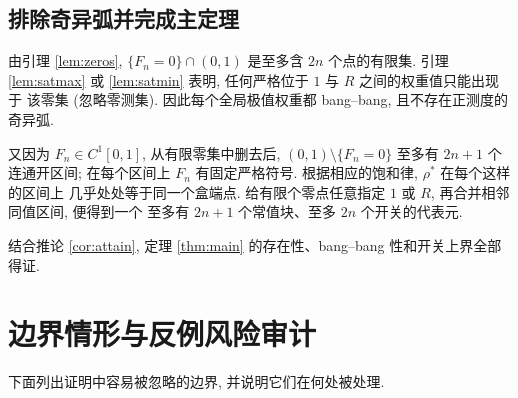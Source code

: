 \documentclass[UTF8]{ctexart}
\begin{document}
\subsection{排除奇异弧并完成主定理}

由引理 \ref{lem:zeros}, $\{F_n=0\}\cap(0,1)$ 是至多含 $2n$ 个点的有限集. 引理
\ref{lem:satmax} 或 \ref{lem:satmin} 表明, 任何严格位于 $1$ 与 $R$ 之间的权重值只能出现于
该零集 (忽略零测集). 因此每个全局极值权重都 bang--bang, 且不存在正测度的奇异弧.

又因为 $F_n\in C^1[0,1]$, 从有限零集中删去后, $(0,1)\setminus\{F_n=0\}$ 至多有 $2n+1$ 个
连通开区间; 在每个区间上 $F_n$ 有固定严格符号. 根据相应的饱和律, $\rho^*$ 在每个这样的区间上
几乎处处等于同一个盒端点. 给有限个零点任意指定 $1$ 或 $R$, 再合并相邻同值区间, 便得到一个
至多有 $2n+1$ 个常值块、至多 $2n$ 个开关的代表元.

结合推论 \ref{cor:attain}, 定理 \ref{thm:main} 的存在性、bang--bang 性和开关上界全部得证.
\section{边界情形与反例风险审计}

下面列出证明中容易被忽略的边界, 并说明它们在何处被处理.
\end{document}
